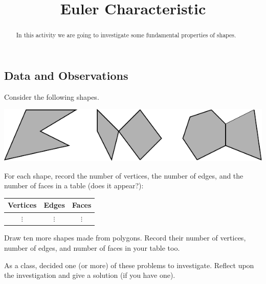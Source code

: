 \documentclass{ximera}
\title{Euler Characteristic}
\begin{document}
\begin{abstract}
In this activity we are going to investigate some fundamental
properties of shapes.
\end{abstract}
\maketitle

\subsection{Data and Observations}


\begin{question}
Consider the following shapes.
\begin{image}
\includegraphics{eulerCharPoly}
\end{image}
For each shape, record the number of vertices, the number of edges,
and the number of faces in a table (does it appear?):
\begin{center}
\begin{tabular}{c|c|c}
Vertices & Edges & Faces\\
\hline\hline
 $\vdots$  & $\vdots$  & $\vdots$  \\ 
\end{tabular}
\end{center}
\begin{freeResponse}
\end{freeResponse}
\end{question}

\newpage

\begin{question}
Draw ten more shapes made from polygons. Record their number of
vertices, number of edges, and number of faces in your table too.
\begin{freeResponse}
\end{freeResponse}
\end{question}


\begin{problem}
As a class, decided one (or more) of these problems to
investigate. Reflect upon the investigation and give a solution (if
you have one).
\begin{freeResponse}
\end{freeResponse}
\end{problem}
\end{document}
